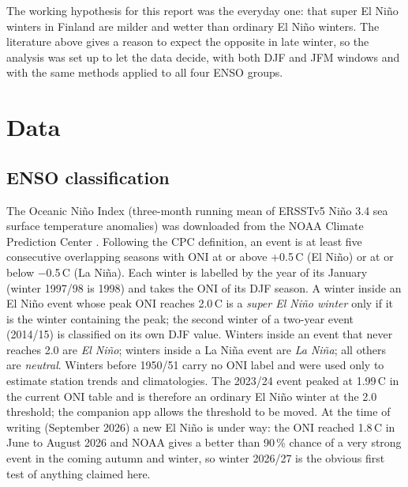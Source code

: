 \documentclass[11pt,a4paper]{article}
\newcommand{\degC}{\textdegree{}C}
\begin{document}
The working hypothesis for this report was the everyday one: that super El Niño winters in Finland are milder and wetter than ordinary El Niño winters. The literature above gives a reason to expect the opposite in late winter, so the analysis was set up to let the data decide, with both DJF and JFM windows and with the same methods applied to all four ENSO groups.

\section{Data}

\subsection{ENSO classification}
The Oceanic Niño Index (three-month running mean of ERSSTv5 Niño 3.4 sea surface temperature anomalies) was downloaded from the NOAA Climate Prediction Center \cite{noaa_oni,huang2017}. Following the CPC definition, an event is at least five consecutive overlapping seasons with ONI at or above +0.5\,\degC{} (El Niño) or at or below $-$0.5\,\degC{} (La Niña). Each winter is labelled by the year of its January (winter 1997/98 is 1998) and takes the ONI of its DJF season. A winter inside an El Niño event whose peak ONI reaches 2.0\,\degC{} is a \emph{super El Niño winter} only if it is the winter containing the peak; the second winter of a two-year event (2014/15) is classified on its own DJF value. Winters inside an event that never reaches 2.0 are \emph{El Niño}; winters inside a La Niña event are \emph{La Niña}; all others are \emph{neutral}. Winters before 1950/51 carry no ONI label and were used only to estimate station trends and climatologies. The 2023/24 event peaked at 1.99\,\degC{} in the current ONI table and is therefore an ordinary El Niño winter at the 2.0 threshold; the companion app allows the threshold to be moved. At the time of writing (September 2026) a new El Niño is under way: the ONI reached 1.8\,\degC{} in June to August 2026 and NOAA gives a better than 90\,\% chance of a very strong event in the coming autumn and winter, so winter 2026/27 is the obvious first test of anything claimed here.
\end{document}
